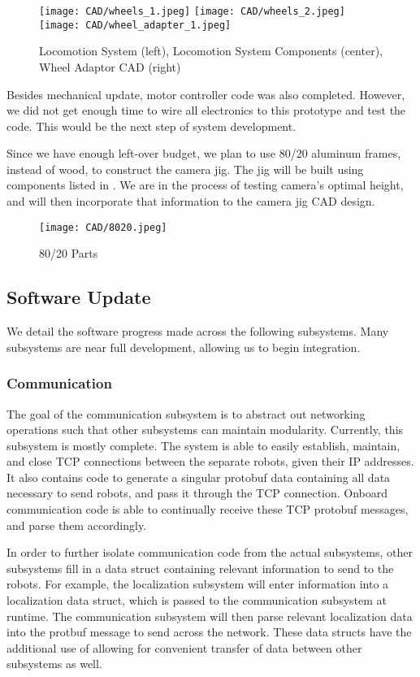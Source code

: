 \begin{figure}[h!]
\centering
\texttt{[image: CAD/wheels\_1.jpeg]}
\texttt{[image: CAD/wheels\_2.jpeg]}
\texttt{[image: CAD/wheel\_adapter\_1.jpeg]}
\caption{Locomotion System (left), Locomotion System Components (center), Wheel Adaptor CAD (right)}
\label{fig:em3}
\end{figure}

Besides mechanical update, motor controller code was also completed. However, we did not get enough time to wire all electronics to this prototype and test the code. This would be the next step of system development.

Since we have enough left-over budget, we plan to use 80/20 aluminum frames, instead of wood, to construct the camera jig. The jig will be built using components listed in . We are in the process of testing camera’s optimal height, and will then incorporate that information to the camera jig CAD design.

\begin{figure}[h!]
\centering
\texttt{[image: CAD/8020.jpeg]}
\caption{80/20 Parts}
\label{fig:em4}
\end{figure}

\subsection{Software Update}
\label{sec:software_progress}
We detail the software progress made across the following subsystems. Many subsystems are near full development, allowing us to begin integration. 

\subsubsection{Communication}
The goal of the communication subsystem is to abstract out networking operations such that other subsystems can maintain modularity. Currently, this subsystem is mostly complete. The system is able to easily establish, maintain, and close TCP connections between the separate robots, given their IP addresses. It also contains code to generate a singular protobuf data containing all data necessary to send robots, and pass it through the TCP connection. Onboard communication code is able to continually receive these TCP protobuf messages, and parse them accordingly.

In order to further isolate communication code from the actual subsystems, other subsystems fill in a data struct containing relevant information to send to the robots. For example, the localization subsystem will enter information into a localization data struct, which is passed to the communication subsystem at runtime. The communication subsystem will then parse relevant localization data into the protbuf message to send across the network. These data structs have the additional use of allowing for convenient transfer of data between other subsystems as well.

